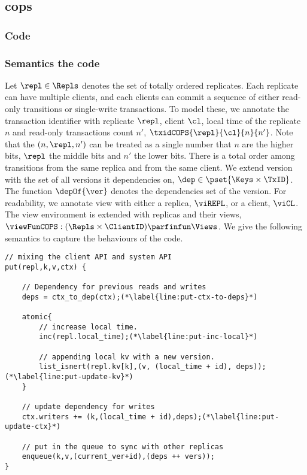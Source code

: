 \subsection{cops}


\subsubsection{Code}
\renewcommand{\thelstlisting}{\arabic{lstlisting}}


\subsubsection{Semantics the code}

Let \( \repl \in \Repls \) denotes the set of totally ordered replicates.
Each replicate can have multiple clients, and 
each clients can commit a sequence of either read-only transitions or single-write transactions.
To model these, we annotate the transaction identifier with replicate \( \repl \), client \( \cl \), 
local time of the replicate \( n \) and read-only transactions count \( n' \), \ie \( \txidCOPS{\repl}{\cl}{n}{n'} \).
Note that the \( (n, \repl, n') \) can be treated as a single number that \( n \) are the higher bits, 
\( \repl \) the middle bits and \( n' \) the lower bits.
There is a total order among transitions from the same replica and from the same client.
We extend version with the set of all versions it dependencies on, \( \dep \in \pset{\Keys \times \TxID} \).
The function \( \depOf{\ver} \) denotes the dependencies set of the version.
For readability, we annotate view with either a replica, \( \viREPL \), or a client, \( \viCL \).
The view environment is extended with replicas and their views, \( \viewFunCOPS : (\Repls \times \ClientID ) \parfinfun \Views \).
We give the following semantics to capture the behaviours of the code.

\begin{lstlisting}[caption={put},label={lst:simplified-put}]
// mixing the client API and system API
put(repl,k,v,ctx) {

    // Dependency for previous reads and writes
    deps = ctx_to_dep(ctx);(*\label{line:put-ctx-to-deps}*)

    atomic{
        // increase local time.
        inc(repl.local_time);(*\label{line:put-inc-local}*) 

        // appending local kv with a new version.
        list_isnert(repl.kv[k],(v, (local_time + id), deps));(*\label{line:put-update-kv}*)
    }

    // update dependency for writes
    ctx.writers += (k,(local_time + id),deps);(*\label{line:put-update-ctx}*)

    // put in the queue to sync with other replicas
    enqueue(k,v,(current_ver+id),(deps ++ vers));
}
\end{lstlisting}


